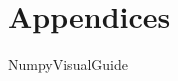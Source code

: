 \documentclass[opener-c,labs,blue,nociteref]{HJnewsiambook}
\begin{document}
\part{Appendices} %
\begin{appendices}
{NumpyVisualGuide}
\end{appendices}
\end{document}
